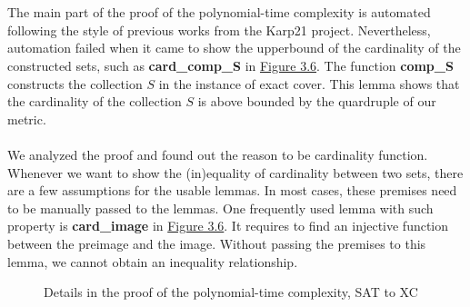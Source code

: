 \\\\
The main part of the proof of the polynomial-time complexity is automated following 
the style of previous works from the Karp21 project. 
Nevertheless, automation failed 
when it came to show the upperbound of the cardinality of the constructed sets, such as 
\textbf{card\_comp\_S} in \hyperref[fig:3.6]{Figure 3.6}. The function \textbf{comp\_S}
constructs the collection $S$ in the instance of exact cover. This lemma shows that 
the cardinality of the collection $S$ is above bounded by the quardruple of our metric.
\\\\
We analyzed the proof and found out the reason to be cardinality function. 
Whenever we want to show the (in)equality of cardinality between two sets, there are a few assumptions 
for the usable lemmas.
In most cases, these premises need to be manually passed to the lemmas. One frequently used lemma 
with such property is \textbf{card\_image} in \hyperref[fig:3.6]{Figure 3.6}. It requires to find 
an injective function between the preimage and the image. 
Without passing the premises to this lemma, we cannot obtain an inequality relationship.
\begin{figure}
    \centering
    \caption{Details in the proof of the polynomial-time complexity, SAT to XC}
    \label{fig:3.6}
\end{figure}


